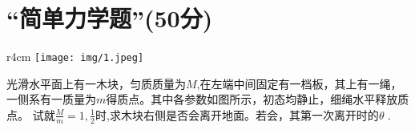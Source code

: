 \documentclass{article}
\begin{document}
\section*{“简单力学题”(50分)}
\begin{wrapfigure}{r}{4cm}
	\vspace{-15pt}    %
	\texttt{[image: img/1.jpeg]}\\
	\vspace{-15pt}    %
	\caption{}
	\vspace{-15pt}    %
\end{wrapfigure}
光滑水平面上有一木块，匀质质量为$M$,在左端中间固定有一档板，其上有一绳，一侧系有一质量为$m$得质点。其中各参数如图所示，初态均静止，细绳水平释放质点。
试就$\frac{M}{m}=1,\frac{1}{2}$时,求木块右侧是否会离开地面。若会，其第一次离开时的$\theta$ .
\end{document}
